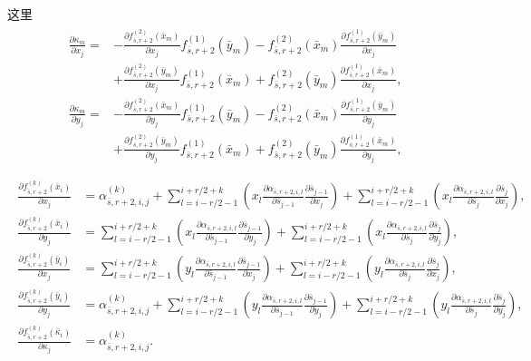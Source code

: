 \documentclass[a4paper,twoside]{ctexart}
\newcommand{\pdfrac}[2]{\frac{\partial #1}{\partial #2}}
\begin{document}
这里
\begin{eqnarray}
  \label{eq:showcalintails1}
  \begin{aligned}
    \pdfrac{\kappa_m}{x_j} =&
    -\pdfrac{f_{\bar{s},r+2}^{(2)}(\bar{x}_m)}{x_j}f_{\bar{s},r+2}^{(1)}(\bar{y}_m)-f_{\bar{s},r+2}^{(2)}(\bar{x}_m)\pdfrac{f_{\bar{s},r+2}^{(1)}(\bar{y}_m)}{x_j}\\
    &+\pdfrac{f_{\bar{s},r+2}^{(2)}(\bar{y}_m)}{x_j}f_{\bar{s},r+2}^{(1)}(\bar{x}_m)+f_{\bar{s},r+2}^{(2)}(\bar{y}_m)\pdfrac{f_{\bar{s},r+2}^{(1)}(\bar{x}_m)}{x_j},\\
    \pdfrac{\kappa_m}{y_j} =&
    -\pdfrac{f_{\bar{s},r+2}^{(2)}(\bar{x}_m)}{y_j}f_{\bar{s},r+2}^{(1)}(\bar{y}_m)-f_{\bar{s},r+2}^{(2)}(\bar{x}_m)\pdfrac{f_{\bar{s},r+2}^{(1)}(\bar{y}_m)}{y_j}\\
    &+\pdfrac{f_{\bar{s},r+2}^{(2)}(\bar{y}_m)}{y_j}f_{\bar{s},r+2}^{(1)}(\bar{x}_m)+f_{\bar{s},r+2}^{(2)}(\bar{y}_m)\pdfrac{f_{\bar{s},r+2}^{(1)}(\bar{x}_m)}{y_j},\\
  \end{aligned}
\end{eqnarray}
\begin{eqnarray}
  \label{eq:showcalintails2}
  \begin{aligned}
    \pdfrac{f_{\bar{s},r+2}^{(k)}(\bar{x}_i)}{x_j} &=
    \alpha_{\bar{s},r+2,i,j}^{(k)} +
    \sum_{l=i-r/2-1}^{i+r/2+k}(x_l\pdfrac{\alpha_{\bar{s},r+2,i,l}}{\bar{s}_{j-1}}\pdfrac{\bar{s}_{j-1}}{x_j})
    +
    \sum_{l=i-r/2-1}^{i+r/2+k}(x_l\pdfrac{\alpha_{\bar{s},r+2,i,l}}{\bar{s}_{j}}\pdfrac{\bar{s}_{j}}{x_j}),\\
    \pdfrac{f_{\bar{s},r+2}^{(k)}(\bar{x}_i)}{y_j} &=
    \sum_{l=i-r/2-1}^{i+r/2+k}(x_l\pdfrac{\alpha_{\bar{s},r+2,i,l}}{\bar{s}_{j-1}}\pdfrac{\bar{s}_{j-1}}{y_j})
    +
    \sum_{l=i-r/2-1}^{i+r/2+k}(x_l\pdfrac{\alpha_{\bar{s},r+2,i,l}}{\bar{s}_{j}}\pdfrac{\bar{s}_{j}}{y_j}),\\
    \pdfrac{f_{\bar{s},r+2}^{(k)}(\bar{y}_i)}{x_j} &=
    \sum_{l=i-r/2-1}^{i+r/2+k}(y_l\pdfrac{\alpha_{\bar{s},r+2,i,l}}{\bar{s}_{j-1}}\pdfrac{\bar{s}_{j-1}}{x_j})
    +
    \sum_{l=i-r/2-1}^{i+r/2+k}(y_l\pdfrac{\alpha_{\bar{s},r+2,i,l}}{\bar{s}_{j}}\pdfrac{\bar{s}_{j}}{x_j}),\\
    \pdfrac{f_{\bar{s},r+2}^{(k)}(\bar{y}_i)}{y_j} &=
    \alpha_{\bar{s},r+2,i,j}^{(k)} +
    \sum_{l=i-r/2-1}^{i+r/2+k}(y_l\pdfrac{\alpha_{\bar{s},r+2,i,l}}{\bar{s}_{j-1}}\pdfrac{\bar{s}_{j-1}}{y_j})
    +
    \sum_{l=i-r/2-1}^{i+r/2+k}(y_l\pdfrac{\alpha_{\bar{s},r+2,i,l}}{\bar{s}_{j}}\pdfrac{\bar{s}_{j}}{y_j}),\\
    \pdfrac{f_{\bar{s},r+2}^{(k)}(\bar{\kappa}_i)}{\kappa_j} &=
    \alpha_{\bar{s},r+2,i,j}^{(k)}
    .\\
  \end{aligned}
\end{eqnarray}
\end{document}
